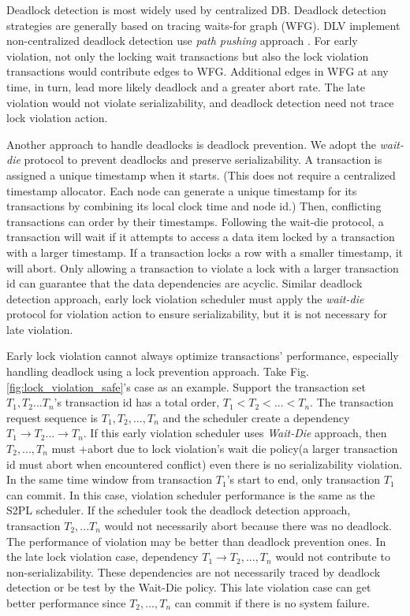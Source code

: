 \documentclass[conference]{IEEEtran}
\begin{document}
Deadlock detection is most widely used by centralized DB.
Deadlock detection strategies are generally
based on tracing waits-for graph (WFG).
DLV implement non-centralized deadlock detection use \emph{path pushing} approach . 
For early violation, 
not only the locking wait transactions but also the lock violation transactions would contribute edges to WFG. 
Additional edges in WFG at any time, in turn, lead more likely deadlock and a greater abort rate.
The late violation would not violate serializability, and  
deadlock detection need not trace lock violation action.

Another approach to handle deadlocks is deadlock prevention.
We adopt the \emph{wait-die} protocol to prevent deadlocks and preserve serializability.
A transaction is assigned a unique timestamp when it starts.
(This does not require a centralized timestamp allocator.
Each node can generate a unique timestamp for its transactions by combining its local clock time and node id.)
Then, conflicting transactions can order by their timestamps.
Following the wait-die protocol, a transaction will wait if it attempts to access a data item locked by a transaction with a larger timestamp.
If a transaction locks a row with a smaller timestamp, it will abort.
Only allowing a transaction to violate a lock with a larger transaction id can guarantee that the data dependencies are acyclic.
Similar deadlock detection approach,
early lock violation scheduler must apply the \emph{wait-die} protocol for violation action to ensure serializability, but it is not necessary for late violation.

Early lock violation cannot always optimize transactions' performance, especially handling deadlock using a lock prevention approach. 
Take Fig.\ref{fig:lock_violation_safe}'s case as an example.
Support the transaction set ${T_1, T_2... T_n}$'s transaction id has a total order, ${T_1 < T_2 < ... < T_n}$.
The transaction request sequence is ${T_1, T_2, ..., T_n}$ and the scheduler create a dependency ${T_1 \rightarrow T_2 ... \rightarrow T_n}$.
If this early violation scheduler uses \emph{Wait-Die} approach, then ${T_2, ..., T_n}$ must +abort due to lock violation's wait die policy(a larger transaction id must abort when encountered conflict) even there is no serializability violation.
In the same time window from transaction ${T_1}$'s start to end, only transaction ${T_1}$ can commit.
In this case, violation scheduler performance is the same as the S2PL scheduler.
If the scheduler took the deadlock detection approach, transaction ${T_2, ... T_n}$ would not necessarily abort because there was no deadlock.
The performance of violation may be better than deadlock prevention ones.
In the late lock violation case, dependency ${T_1 \rightarrow T_2 , ... ,T_n}$ would not contribute to non-serializability.
These dependencies are not necessarily traced by deadlock detection or be test by the Wait-Die policy.
This late violation case can get better performance since ${T_2,..., T_n}$ can commit if there is no system failure.
\end{document}
